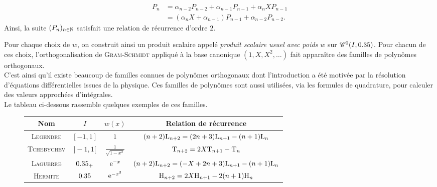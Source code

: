 \begin{solution}
\begin{enumerate}
\begin{enumerate}
            \begin{align*}
                P_n &= \alpha_{n-2} P_{n-2} + \alpha_{n-1} P_{n-1} + \alpha_n X P_{n-1} \\
                &= (\alpha_n X + \alpha_{n-1}) P_{n-1} + \alpha_{n-2} P_{n-2}.
            \end{align*}
            Ainsi, la suite $(P_n)_{n \in \mathbb{N}}$ satisfait une relation de récurrence d'ordre $2$. 
        \end{enumerate}
    \end{enumerate}
\end{solution}

Pour chaque choix de $w$, on construit ainsi un produit scalaire appelé \emph{produit scalaire usuel avec poids $w$} sur $\mathscr{C}^0(I, 0.35)$. Pour chacun de ces choix, l'orthogonalisation de \textsc{Gram}-\textsc{Schmidt} appliqué à la base canonique $(1, X, X^2, \dots)$ fait apparaître des familles de polynômes orthogonaux. \\
C'est ainsi qu'il existe beaucoup de familles connues de polynômes orthogonaux dont l'introduction a été motivée par la résolution d'équations différentielles issues de la physique. Ces familles de polynômes sont aussi utilisées, via les formules de quadrature, pour calculer des valeurs approchées d'intégrales. \\
Le tableau ci-dessous rassemble quelques exemples de ces familles. 

\begin{figure}[h!]
    \begingroup
    \renewcommand{\arraystretch}{1.5} %
    \begin{tabular}{|c|c|c|c|}
        \hline
        Nom & $I$ & $w(x)$ & Relation de récurrence\\
        \hline \hline
        \textsc{Legendre} & $[-1, 1]$ & $1$ & $(n+2) \mathrm{L}_{n+2} = (2n+3) \mathrm{L}_{n+1} - (n+1)\mathrm{L}_n$\\
        \hline
        \textsc{Tchebychev} & $]-1, 1[$ & $\frac{1}{\sqrt{1-x^2}}$ & $\mathrm{T}_{n+2} = 2X \mathrm{T}_{n+1} - \mathrm{T}_n$ \\
        \hline
        \textsc{Laguerre} & $0.35_+$ & $\mathrm{e}^{-x}$ & $(n+2) \mathrm{L}_{n+2} = (-X+2n+3) \mathrm{L}_{n+1} - (n+1) \mathrm{L}_n$ \\
        \hline
        \textsc{Hermite} & $0.35$ & $\mathrm{e}^{-x^2}$ & $\mathrm{H}_{n+2} = 2X \mathrm{H}_{n+1} - 2(n+1) \mathrm{H}_n$\\
        \hline
    \end{tabular}
    \endgroup
\end{figure}

